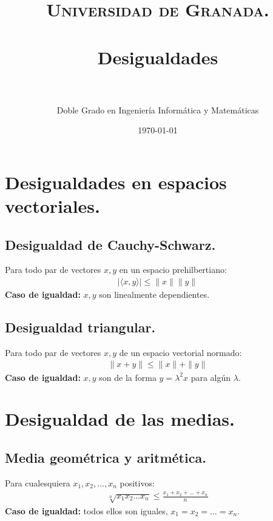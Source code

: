 \documentclass[paper=a4, fontsize=11pt, spanish]{scrartcl} %
\title{	
\normalfont \normalsize 
\textsc{Universidad de Granada.} \\ [25pt] %
\horrule{0.5pt} \\[0.4cm] %
\huge Desigualdades \\ %
\horrule{2pt} \\[0.5cm] %
}
\author{Doble Grado en Ingeniería Informática y Matemáticas} %
\date{\normalsize\today} %
\numberwithin{equation}{section} %
\numberwithin{figure}{section} %
\numberwithin{table}{section} %
\begin{document}
\maketitle %

\newcommand {\equality}[1]{\textbf{Caso de igualdad:} {#1}}


\section{Desigualdades en espacios vectoriales.}
 \subsection{Desigualdad de Cauchy-Schwarz.}
  Para todo par de vectores $x,y$ en un espacio prehilbertiano:
  \begin{align}
   |{\langle x,y \rangle}| \leq \|x\|\|y\|
  \end{align}
  \equality{$x,y$ son linealmente dependientes.}
  
  \subsection{Desigualdad triangular.}
  Para todo par de vectores $x,y$ de un espacio vectorial normado:
  \begin{align}
    \displaystyle \|x+y\| \leq \|x\|+\|y\|
  \end{align}
  \equality{$x,y$ son de la forma $y = \lambda^2x$ para algún $\lambda$.}

  
\section{Desigualdad de las medias.}
  \subsection{Media geométrica y aritmética.}
    Para cualesquiera $x_1,x_2,\dots,x_n$ positivos:
    \begin{align}
      \sqrt[n]{x_1x_2 \dots x_n} \leq \frac{x_1+x_2+\dots+x_n}{n}
    \end{align}
    \equality{todos ellos son iguales, $x_1=x_2=\dots=x_n$.}
    
\end{document}
